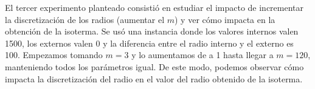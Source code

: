 El tercer experimento planteado consistió en estudiar el impacto de incrementar la discretización de los radios (aumentar el $m$) y ver cómo impacta en la obtención de la isoterma. Se usó una instancia donde los valores internos valen 1500, los externos valen 0 y la diferencia entre el radio interno y el externo es 100. Empezamos tomando $m=3$ y lo aumentamos de a 1 hasta llegar a $m=120$, manteniendo todos los parámetros igual. De este modo, podemos observar cómo impacta la discretización del radio en el valor del radio obtenido de la isoterma.\\
